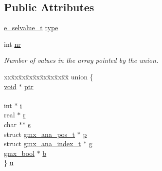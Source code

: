 \subsection*{\-Public \-Attributes}
\begin{DoxyCompactItemize}
\item 
\hyperlink{include_2selvalue_8h_a70b42b87d434580bf1493591857b8bec}{e\-\_\-selvalue\-\_\-t} \hyperlink{structgmx__ana__selvalue__t_a0a7b3be96275660c0fb58068c31d8daf}{type}
\item 
int \hyperlink{structgmx__ana__selvalue__t_a80661a78ccd9ecb369adb4c0d4bb2c72}{nr}
\begin{DoxyCompactList}\small\item\em \-Number of values in the array pointed by the union. \end{DoxyCompactList}\item 
\begin{tabbing}
xx\=xx\=xx\=xx\=xx\=xx\=xx\=xx\=xx\=\kill
union \{\\
\>\hyperlink{nbnxn__kernel__simd__4xn__outer_8h_a8dc3f4a797ed992dff49d2fa3477eee8}{void} $\ast$ \hyperlink{structgmx__ana__selvalue__t_a12b279f9954e6c83e9e9957fcde06e81}{ptr}\\
\>\\
\>int $\ast$ \hyperlink{structgmx__ana__selvalue__t_af72b5764d0dbc8bc2c4479cc6f4c8148}{i}\\
\>real $\ast$ \hyperlink{structgmx__ana__selvalue__t_afdab2e1a8e6d0b4157f0d823f063020a}{r}\\
\>char $\ast$$\ast$ \hyperlink{structgmx__ana__selvalue__t_aa4c476a22542ca86519dc9851c08e767}{s}\\
\>struct \hyperlink{structgmx__ana__pos__t}{gmx\_ana\_pos\_t} $\ast$ \hyperlink{structgmx__ana__selvalue__t_a5ac7ec54e9c4bd24a4e1c525eb8ab996}{p}\\
\>struct \hyperlink{structgmx__ana__index__t}{gmx\_ana\_index\_t} $\ast$ \hyperlink{structgmx__ana__selvalue__t_aecb3187d4996ff0548a69f97e258aecb}{g}\\
\>\hyperlink{include_2types_2simple_8h_a8fddad319f226e856400d190198d5151}{gmx\_bool} $\ast$ \hyperlink{structgmx__ana__selvalue__t_a040d77c026d33b7da43871c37c92eebb}{b}\\
\} \hyperlink{structgmx__ana__selvalue__t_a623f44abe0246882e1d86e116b56c89c}{u}\\


\end{tabbing}
\end{DoxyCompactItemize}
